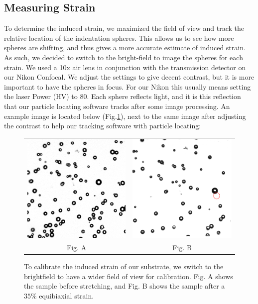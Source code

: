 \subsection{Measuring Strain}
To determine the induced strain, we maximized the field of view and track the relative location of the indentation spheres. This allows us to see how more spheres are shifting, and thus gives a more accurate estimate of induced strain. As such, we decided to switch to the bright-field to image the spheres for each strain. We used a 10x air lens in conjunction with the transmission detector on our Nikon Confocal. We adjust the settings to give decent contrast, but it is more important to have the spheres in focus. For our Nikon this usually means setting the laser Power (HV) to 80. Each sphere reflects light, and it is this reflection that our particle locating software tracks after some image processing. An example image is located below (Fig.\ref{fig:TDpreandpost}), next to the same image after adjusting the contrast to help our tracking software with particle locating: 
\begin{figure}[h!]
	\begin{tabular}{cc}
		\includegraphics[width= .48\linewidth,frame]{Chapters/Figures/181115_unstretched_b_thesis_contrast.png} & \includegraphics[width= .48\linewidth,frame]{Chapters/Figures/181115_stretched_thesis_contrast.png}\\
		Fig. A & Fig. B
	\end{tabular}
	\caption[Bright-field stretch calibration images]{To calibrate the induced strain of our substrate, we switch to the brightfield to have a wider field of view for calibration. Fig. A shows the sample before stretching, and Fig. B shows the sample after a $ 35\% $ equibiaxial strain.}
		\label{fig:TDpreandpost}
\end{figure}

